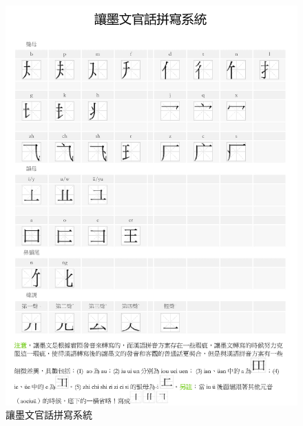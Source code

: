 \documentclass[a5paper, 12pt, openany]{book} %
\begin{document}
	
\begin{figure}[H]
  \centering
  \includegraphics[width=1\textwidth]{./images/rangmowen_5.png}
  \caption{讓墨文官話拼寫系統}
  \label{fig:rangmowen_5}
\end{figure}
\end{document}
